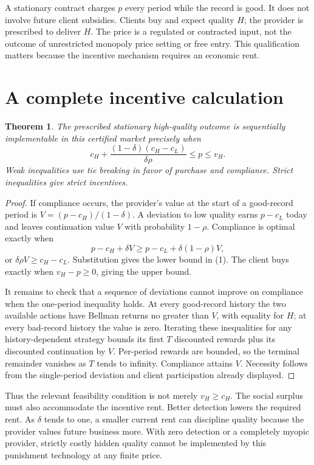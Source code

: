 \documentclass[11pt,a4paper]{article}
\newtheorem{theorem}{Theorem}[section]
\begin{document}
A stationary contract charges $p$ every period while the record is good. It does not involve future client subsidies. Clients buy and expect quality $H$; the provider is prescribed to deliver $H$. The price is a regulated or contracted input, not the outcome of unrestricted monopoly price setting or free entry. This qualification matters because the incentive mechanism requires an economic rent.
\section{A complete incentive calculation}
\begin{theorem}
The prescribed stationary high-quality outcome is sequentially implementable in this certified market precisely when
\[
 c_H+\frac{(1-\delta)(c_H-c_L)}{\delta\rho}\le p\le v_H.
 \tag{1}
\]
Weak inequalities use tie breaking in favor of purchase and compliance. Strict inequalities give strict incentives.
\end{theorem}
\begin{proof}
If compliance occurs, the provider's value at the start of a good-record period is
$V=(p-c_H)/(1-\delta)$. A deviation to low quality earns $p-c_L$ today and leaves continuation value $V$ with probability $1-\rho$. Compliance is optimal exactly when
\[
 p-c_H+\delta V\ge p-c_L+\delta(1-\rho)V,
\]
or $\delta\rho V\ge c_H-c_L$. Substitution gives the lower bound in (1). The client buys exactly when $v_H-p\ge0$, giving the upper bound.

It remains to check that a sequence of deviations cannot improve on compliance when the one-period inequality holds. At every good-record history the two available actions have Bellman returns no greater than $V$, with equality for $H$; at every bad-record history the value is zero. Iterating these inequalities for any history-dependent strategy bounds its first $T$ discounted rewards plus its discounted continuation by $V$. Per-period rewards are bounded, so the terminal remainder vanishes as $T$ tends to infinity. Compliance attains $V$. Necessity follows from the single-period deviation and client participation already displayed.
\end{proof}
Thus the relevant feasibility condition is not merely $v_H\ge c_H$. The social surplus must also accommodate the incentive rent. Better detection lowers the required rent. As $\delta$ tends to one, a smaller current rent can discipline quality because the provider values future business more. With zero detection or a completely myopic provider, strictly costly hidden quality cannot be implemented by this punishment technology at any finite price.
\end{document}
